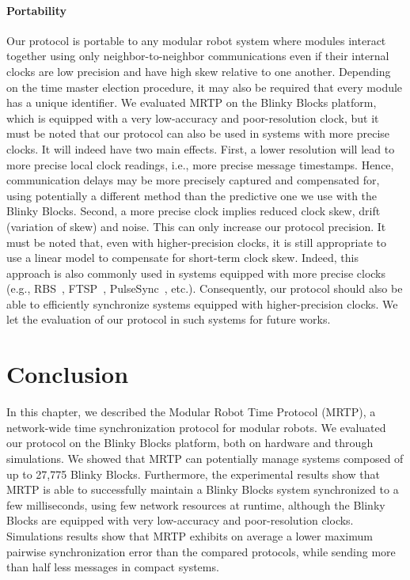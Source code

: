 \paragraph{Portability}
Our protocol is portable to any modular robot system where modules interact together using only neighbor-to-neighbor communications even if their internal clocks are low precision and have high skew relative to one another. Depending on the time master election procedure, it may also be required that every module has a unique identifier. We evaluated MRTP on the Blinky Blocks platform, which is equipped with a very low-accuracy and poor-resolution clock, but it must be noted that our protocol can also be used in systems with more precise clocks. It will indeed have two main effects. First, a lower resolution will lead to more precise local clock readings, i.e., more precise message timestamps. Hence, communication delays may be more precisely captured and compensated for, using potentially a different method than the predictive one we use with the Blinky Blocks. Second, a more precise clock implies reduced clock skew, drift (variation of skew) and noise. This can only increase our protocol precision. It must be noted that, even with higher-precision clocks, it is still appropriate to use a linear model to compensate for short-term clock skew. Indeed, this approach is also commonly used in systems equipped with more precise clocks (e.g., RBS~\cite{elson2002fine}, FTSP~\cite{maroti2004flooding}, PulseSync~\cite{lenzen2015pulsesync}, etc.). Consequently, our protocol should also be able to efficiently synchronize systems equipped with higher-precision clocks. We let the evaluation of our protocol in such systems for future works.

\section{Conclusion}
\label{section:time-sync:conclusion}

In this chapter, we described the Modular Robot Time Protocol (MRTP), a network-wide time synchronization protocol for modular robots. We evaluated our protocol on the Blinky Blocks platform, both on hardware and through simulations. We showed that MRTP can potentially manage systems composed of up to 27,775 Blinky Blocks. Furthermore, the experimental results show that MRTP is able to successfully maintain a Blinky Blocks system synchronized to a few milliseconds, using few network resources at runtime, although the Blinky Blocks are equipped with very low-accuracy and poor-resolution clocks. Simulations results show that MRTP exhibits on average a lower maximum pairwise synchronization error than the compared protocols, while sending more than half less messages in compact systems.
